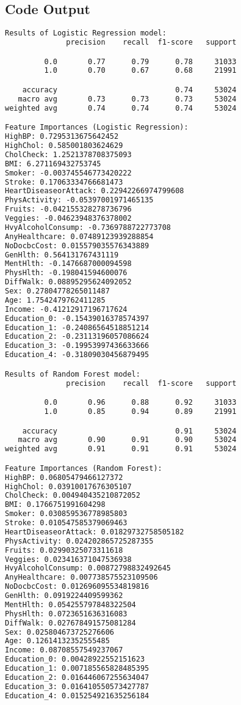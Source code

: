 \documentclass[12pt]{article}
\begin{document}
\subsection{Code Output}

\begin{lstlisting}[language=TeX]
Results of Logistic Regression model:
              precision    recall  f1-score   support

         0.0       0.77      0.79      0.78     31033
         1.0       0.70      0.67      0.68     21991

    accuracy                           0.74     53024
   macro avg       0.73      0.73      0.73     53024
weighted avg       0.74      0.74      0.74     53024

Feature Importances (Logistic Regression):
HighBP: 0.7295313675642452
HighChol: 0.585001803624629
CholCheck: 1.2521378708375093
BMI: 6.271169432753745
Smoker: -0.003745546773420222
Stroke: 0.17063334766681473
HeartDiseaseorAttack: 0.22942266974799608
PhysActivity: -0.05397001971465135
Fruits: -0.042155328278736796
Veggies: -0.04623948376378002
HvyAlcoholConsump: -0.7369788722773708
AnyHealthcare: 0.07489123939288854
NoDocbcCost: 0.015579035576343889
GenHlth: 0.564131767431119
MentHlth: -0.1476687000094598
PhysHlth: -0.198041594600076
DiffWalk: 0.08895295624092052
Sex: 0.27804778265011487
Age: 1.7542479762411285
Income: -0.41212917196717624
Education_0: -0.15439016378574397
Education_1: -0.24086564518851214
Education_2: -0.23113196057086624
Education_3: -0.19953997436633666
Education_4: -0.31809030456879495

Results of Random Forest model:
              precision    recall  f1-score   support

         0.0       0.96      0.88      0.92     31033
         1.0       0.85      0.94      0.89     21991

    accuracy                           0.91     53024
   macro avg       0.90      0.91      0.90     53024
weighted avg       0.91      0.91      0.91     53024

Feature Importances (Random Forest):
HighBP: 0.06805479466127372
HighChol: 0.03910017676305107
CholCheck: 0.004940435210872052
BMI: 0.1766751991604298
Smoker: 0.030859536778985803
Stroke: 0.010547585379069463
HeartDiseaseorAttack: 0.01829732758505182
PhysActivity: 0.024202865725287355
Fruits: 0.02990325073311618
Veggies: 0.023416371047536938
HvyAlcoholConsump: 0.00872798832492645
AnyHealthcare: 0.007738575523109506
NoDocbcCost: 0.012696095534819816
GenHlth: 0.0919224409599362
MentHlth: 0.054255797848322504
PhysHlth: 0.0723651636316083
DiffWalk: 0.027678491575081284
Sex: 0.025804673725276606
Age: 0.12614132352555485
Income: 0.08708557549237067
Education_0: 0.00428922552151623
Education_1: 0.007185565828485395
Education_2: 0.016446067255634047
Education_3: 0.016410550573427787
Education_4: 0.015254921635256184


\end{lstlisting}
\end{document}
